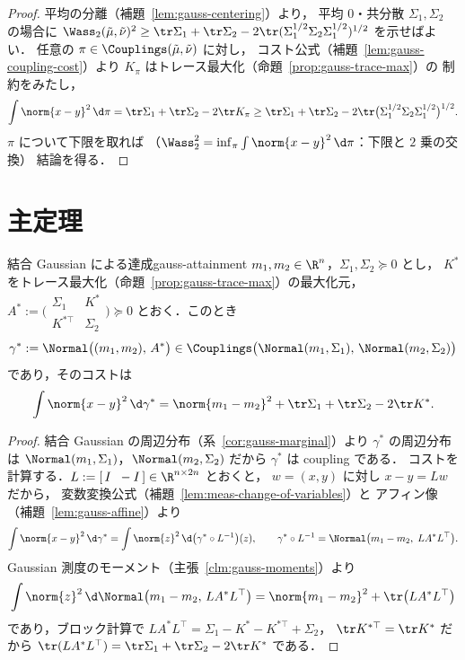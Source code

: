 \begin{proof}
  平均の分離（補題~\ref{lem:gauss-centering}）より，
  平均 $0$・共分散 $\Sigma_1,\Sigma_2$ の場合に
  $\Wass_2(\tilde\mu,\tilde\nu)^2\geq
  \tr\Sigma_1+\tr\Sigma_2-2\tr(\Sigma_1^{1/2}\Sigma_2\Sigma_1^{1/2})^{1/2}$
  を示せばよい．
  任意の $\pi\in\Couplings(\tilde\mu,\tilde\nu)$ に対し，
  コスト公式（補題~\ref{lem:gauss-coupling-cost}）より
  $K_\pi$ はトレース最大化（命題~\ref{prop:gauss-trace-max}）の
  制約をみたし，
  \[
    \int\norm{x-y}^2\,\d\pi
    =\tr\Sigma_1+\tr\Sigma_2-2\tr K_\pi
    \geq
    \tr\Sigma_1+\tr\Sigma_2
    -2\tr\bigl(\Sigma_1^{1/2}\Sigma_2\Sigma_1^{1/2}\bigr)^{1/2}.
  \]
  $\pi$ について下限を取れば
  （$\Wass_2^2=\inf_\pi\int\norm{x-y}^2\,\d\pi$：下限と $2$ 乗の交換）
  結論を得る．
\end{proof}

\section{主定理}
\label{sec:gauss-main}

\begin{proposition}{結合 Gaussian による達成}{gauss-attainment}
  $m_1,m_2\in\R^n$，$\Sigma_1,\Sigma_2\succeq0$ とし，
  $K^*$ をトレース最大化（命題~\ref{prop:gauss-trace-max}）の最大化元，
  $A^*:=\bigl(\begin{smallmatrix}\Sigma_1&K^*\\K^{*\top}&\Sigma_2\end{smallmatrix}\bigr)\succeq0$
  とおく．このとき
  \[
    \gamma^*:=\Normal\bigl((m_1,m_2),\,A^*\bigr)
    \in\Couplings\bigl(\Normal(m_1,\Sigma_1),\,\Normal(m_2,\Sigma_2)\bigr)
  \]
  であり，そのコストは
  \[
    \int\norm{x-y}^2\,\d\gamma^*
    =\norm{m_1-m_2}^2
    +\tr\Sigma_1+\tr\Sigma_2-2\tr K^*.
  \]
\end{proposition}

\begin{proof}
  結合 Gaussian の周辺分布（系~\ref{cor:gauss-marginal}）より
  $\gamma^*$ の周辺分布は $\Normal(m_1,\Sigma_1)$，$\Normal(m_2,\Sigma_2)$
  だから $\gamma^*$ は coupling である．
  コストを計算する．$L:=[\,I\;\;-I\,]\in\R^{n\times2n}$ とおくと，
  $w=(x,y)$ に対し $x-y=Lw$ だから，
  変数変換公式（補題~\ref{lem:meas-change-of-variables}）と
  アフィン像（補題~\ref{lem:gauss-affine}）より
  \[
    \int\norm{x-y}^2\,\d\gamma^*
    =\int\norm{z}^2\,\d\bigl(\gamma^*\circ L^{-1}\bigr)(z),
    \qquad
    \gamma^*\circ L^{-1}
    =\Normal\bigl(m_1-m_2,\;LA^*L^\top\bigr).
  \]
  Gaussian 測度のモーメント（主張~\ref{clm:gauss-moments}）より
  \[
    \int\norm{z}^2\,\d\Normal\bigl(m_1-m_2,\,LA^*L^\top\bigr)
    =\norm{m_1-m_2}^2+\tr\bigl(LA^*L^\top\bigr)
  \]
  であり，ブロック計算で
  $LA^*L^\top=\Sigma_1-K^*-K^{*\top}+\Sigma_2$，
  $\tr K^{*\top}=\tr K^*$ だから
  $\tr(LA^*L^\top)=\tr\Sigma_1+\tr\Sigma_2-2\tr K^*$ である．
\end{proof}

